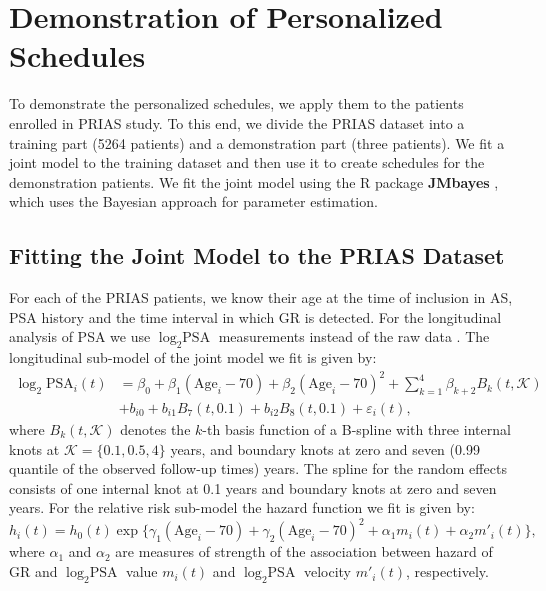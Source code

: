 
\section{Demonstration of Personalized Schedules}
\label{sec : pers_schedule_PRIAS}
To demonstrate the personalized schedules, we apply them to the patients enrolled in PRIAS study. To this end, we divide the PRIAS dataset into a training part (5264 patients) and a demonstration part (three patients). We fit a joint model to the training dataset and then use it to create schedules for the demonstration patients. We fit the joint model using the R package \textbf{JMbayes} \citep{rizopoulosJMbayes}, which uses the Bayesian approach for parameter estimation.

\subsection{Fitting the Joint Model to the PRIAS Dataset}
\label{subsec : jm_fit_prias}
For each of the PRIAS patients, we know their age at the time of inclusion in AS, PSA history and the time interval in which GR is detected. For the longitudinal analysis of PSA we use $\log_2 \mbox{PSA}$ measurements instead of the raw data \citep{nieboer2015nonlinear}. The longitudinal sub-model of the joint model we fit is given by:
\begin{equation}
\label{eq : long_model_prias}
\begin{aligned}
\log_2 \mbox{PSA}_i(t) &= \beta_0 + \beta_1 (\mbox{Age}_i-70) + \beta_2 (\mbox{Age}_i-70)^2 + \sum_{k=1}^4 \beta_{k+2} B_k(t,\mathcal{K})\\ 
&+  b_{i0} + b_{i1} B_7(t, 0.1) + b_{i2} B_8(t, 0.1) +
\varepsilon_i(t),
\end{aligned}
\end{equation}
where $B_k(t, \mathcal{K})$ denotes the $k$-th basis function of a B-spline with three internal knots at $\mathcal{K} =\{0.1, 0.5, 4\}$ years, and boundary knots at zero and seven (0.99 quantile of the observed follow-up times) years. The spline for the random effects consists of one internal knot at 0.1 years and boundary knots at zero and seven years. For the relative risk sub-model the hazard function we fit is given by:
\begin{equation}
\label{eq : hazard_prias}
h_i(t) = h_0(t) \exp\big\{\gamma_1 (\mbox{Age}_i-70)  + \gamma_2 (\mbox{Age}_i-70)^2 + \alpha_1 m_i(t) + \alpha_2 m'_i(t)\big\},
\end{equation}
where $\alpha_1$ and $\alpha_2$ are measures of strength of the association between hazard of GR and $\log_2 \mbox{PSA}$ value $m_i(t)$ and $\log_2 \mbox{PSA}$ velocity $m'_i(t)$, respectively.

